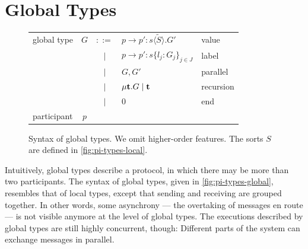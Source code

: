 \documentclass[a4paper,12pt,oneside,fleqn]{book} %
\begin{document}
\section{Global Types}
\label{sec:mast-global}

\begin{figure} %
\begin{center}
\begin{tabular}{lccll}
global type & $G$
  & $::=$ & $p \to p' : s\langle\tilde{S}\rangle.G'$ & value
  \\  && $\mid$ & $p\to p' : s \{l_j : G_j\}_{j\in J}$  & label
  \\ && $\mid$  & $G,G'$ & parallel
  \\ && $\mid$ & $\mu {\bf t}. G \mid {\bf t}$ & recursion
  \\ && $\mid$ & $0$ & end \\
participant & $p$
\end{tabular}
\end{center}
\caption{
  Syntax of global types.
  We omit higher-order features.
  The sorts $S$ are defined in \autoref{fig:pi-types-local}.
}
\label{fig:pi-types-global}
\end{figure} %

Intuitively,
  global types describe a protocol,
  in which there may be more than two participants.
The syntax of global types,
  given in \autoref{fig:pi-types-global},
  resembles that of local types,
    except that sending and receiving are grouped together.
In other words,
  some asynchrony --- the overtaking of messages en route ---
  is not visible anymore at the level of global types.
The executions described by global types are still highly concurrent, though:
  Different parts of the system can exchange messages in parallel.
\end{document}
